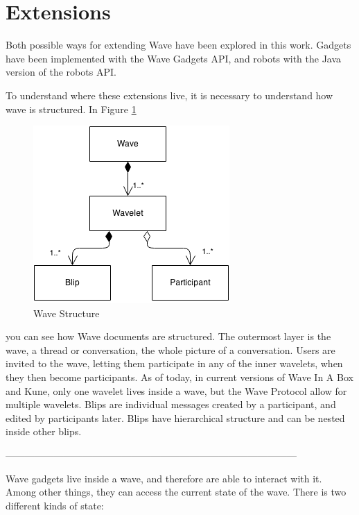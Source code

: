 \newpage
\section{Extensions}

Both possible ways for extending Wave have been explored in this work. Gadgets have been implemented with the Wave Gadgets API, and robots with the Java version of the robots API.

To understand where these extensions live, it is necessary to understand how wave is structured. In Figure \ref{fig:wave_structure}
\begin{figure}[h]
  \center
    \includegraphics[keepaspectratio, scale=0.75]{Media/Diagrams/Wave/Structure.png}
  \caption{Wave Structure}
  \label{fig:wave_structure}
\end{figure}
you can see how Wave documents are structured. The outermost layer is the wave, a thread or conversation, the whole picture of a conversation. Users are invited to the wave, letting them participate in any of the inner wavelets, when they then become participants. As of today, in current versions of Wave In A Box and Kune, only one wavelet lives inside a wave, but the Wave Protocol allow for multiple wavelets. Blips are individual messages created by a participant, and edited by participants later. Blips have hierarchical structure and can be nested inside other blips.


\begin{center}
------------------------------------------------------------------------------------------\\
\end{center}

Wave gadgets live inside a wave, and therefore are able to interact with it. Among other things, they can access the current state of the wave. There is two different kinds of state:

